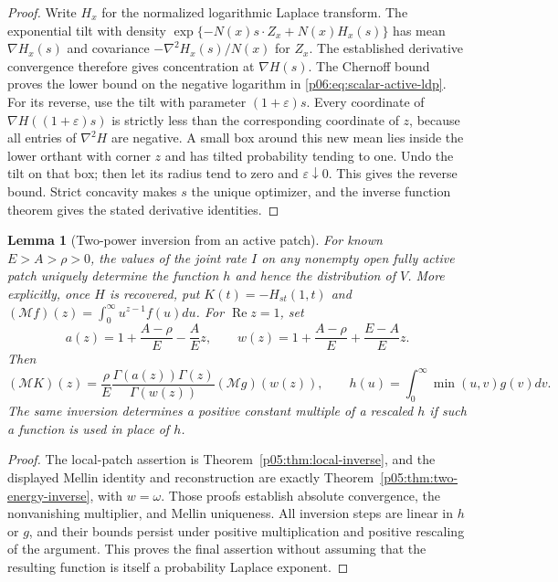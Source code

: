 \documentclass[11pt,letterpaper]{article}
\newtheorem{lemma}[theorem]{Lemma}
\theoremstyle{definition}
\theoremstyle{remark}
\renewcommand{\Re}{\operatorname{Re}}
\newcommand{\1}{\mathbf 1}
\begin{document}
\begin{proof}
Write $H_x$ for the normalized logarithmic Laplace transform.
The exponential tilt with density
$\exp\{-N(x)s\cdot Z_x+N(x)H_x(s)\}$ has
mean $\nabla H_x(s)$ and covariance
$-\nabla^2H_x(s)/N(x)$ for $Z_x$.
The established derivative convergence therefore gives concentration
at $\nabla H(s)$.  The Chernoff bound proves the lower bound on the
negative logarithm in \eqref{p06:eq:scalar-active-ldp}.
For its reverse, use the tilt with parameter $(1+\varepsilon)s$.
Every coordinate of $\nabla H((1+\varepsilon)s)$ is strictly less
than the corresponding coordinate of $z$, because all entries of
$\nabla^2H$ are negative.  A small box around this new mean lies
inside the lower orthant with corner $z$ and has tilted probability
tending to one.  Undo the tilt on that box; then let its radius tend
to zero and $\varepsilon\downarrow0$.  This gives the reverse
bound.  Strict concavity makes $s$ the unique optimizer, and the
inverse function theorem gives the stated derivative identities.
\end{proof}

\begin{lemma}[Two-power inversion from an active patch]
\label{p06:lem:scalar-mellin-foundation}
For known $E>A>\rho>0$, the values of the joint rate $I$ on any
nonempty open fully active patch uniquely determine the function
$h$ and hence the distribution of $V$.
More explicitly, once $H$ is recovered, put
$K(t)=-H_{st}(1,t)$ and
$(\mathcal Mf)(z)=\int_0^\infty u^{z-1}f(u)du$.
For $\Re z=1$, set
\[
 a(z)=1+\frac{A-\rho}{E}-\frac AEz,\qquad
 w(z)=1+\frac{A-\rho}{E}+\frac{E-A}{E}z.
\]
Then
\begin{equation}\label{p06:eq:scalar-foundation-mellin}
 (\mathcal MK)(z)=\frac\rho E
 \frac{\Gamma(a(z))\Gamma(z)}{\Gamma(w(z))}
 (\mathcal Mg)(w(z)),
 \qquad
 h(u)=\int_0^\infty\min(u,v)g(v)dv.
\end{equation}
The same inversion determines a positive constant multiple of a
rescaled $h$ if such a function is used in place of $h$.
\end{lemma}

\begin{proof}
The local-patch assertion is Theorem~\ref{p05:thm:local-inverse},
and the displayed Mellin identity and reconstruction are exactly
Theorem~\ref{p05:thm:two-energy-inverse}, with $w=\omega$.
Those proofs establish absolute convergence, the nonvanishing multiplier,
and Mellin uniqueness. All inversion steps are linear in $h$ or $g$,
and their bounds persist under positive multiplication and positive
rescaling of the argument. This proves the final assertion without
assuming that the resulting function is itself a probability
Laplace exponent.
\end{proof}
\end{document}
